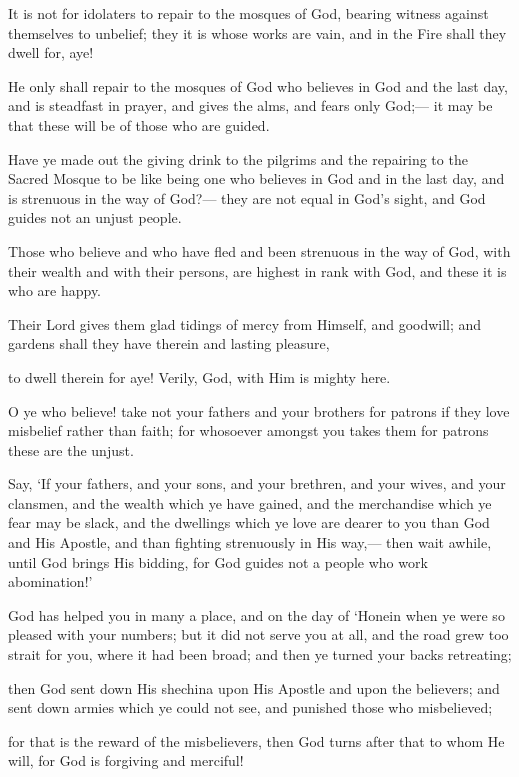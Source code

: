 \documentclass[fontsize=14pt, letterpaper, notitlepage, openany, DIV=12]{scrbook} %
\begin{document}
\noindent[9:17]
It is not for idolaters to repair to the mosques of God, bearing witness against themselves
to unbelief; they it is whose works are vain, and in the Fire shall they dwell for, aye!

\noindent[9:18]
He only shall repair to the mosques of God who believes in God and the last day, and is
steadfast in prayer, and gives the alms, and fears only God;--- it may be that these will be of
those who are guided.

\noindent[9:19]
Have ye made out the giving drink to the pilgrims and the repairing to the Sacred Mosque
to be like being one who believes in God and in the last day, and is strenuous in the way of
God?--- they are not equal in God's sight, and God guides not an unjust people.

\noindent[9:20]
Those who believe and who have fled and been strenuous in the way of God, with their
wealth and with their persons, are highest in rank with God, and these it is who are happy.

\noindent[9:21]
Their Lord gives them glad tidings of mercy from Himself, and goodwill; and gardens
shall they have therein and lasting pleasure,

\noindent[9:22]
to dwell therein for aye! Verily, God, with Him is mighty here.

\noindent[9:23]
O ye who believe! take not your fathers and your brothers for patrons if they love
misbelief rather than faith; for whosoever amongst you takes them for patrons these are the
unjust.

\noindent[9:24]
Say, `If your fathers, and your sons, and your brethren, and your wives, and your
clansmen, and the wealth which ye have gained, and the merchandise which ye fear may be
slack, and the dwellings which ye love are dearer to you than God and His Apostle, and than
fighting strenuously in His way,--- then wait awhile, until God brings His bidding, for God
guides not a people who work abomination!'

\noindent[9:25]
God has helped you in many a place, and on the day of `Honein when ye were so pleased
with your numbers; but it did not serve you at all, and the road grew too strait for you, where it
had been broad; and then ye turned your backs retreating;

\noindent[9:26]
then God sent down His shechina upon His Apostle and upon the believers; and sent
down armies which ye could not see, and punished those who misbelieved;

\noindent[9:27]
for that is the reward of the misbelievers, then God turns after that to whom He will, for
God is forgiving and merciful!
\end{document}
